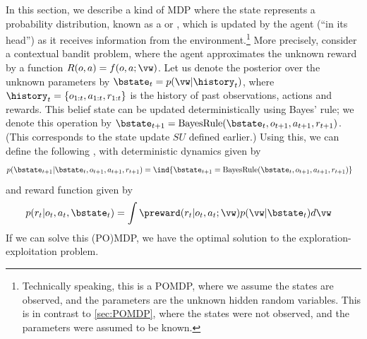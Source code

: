 In this section, we describe a kind of MDP where the state
represents a probability distribution,
known as a  or ,
which is updated by the agent (``in its head'') as it receives
information from the environment.\footnote{
%
Technically speaking,  this is a POMDP, where we assume the states are observed,
and the parameters are the unknown hidden random variables.
This is in contrast to \cref{sec:POMDP},
where the states were not observed, and the parameters were assumed to be known.
} %
More precisely, consider a contextual bandit problem,
where the agent approximates the unknown reward by a function
$R(o,a)=f(o,a;\vw)$.
Let us denote the posterior over the unknown parameters
by $\bstate_t=p(\vw|\history_t)$,
where $\history_t = \{ o_{1:t}, a_{1:t}, r_{1:t} \}$
is the history of past observations, actions and rewards.
This belief state can be updated deterministically using Bayes' rule;
we denote this operation by
$\bstate_{t+1}=\mathrm{BayesRule}(\bstate_{t},o_{t+1},a_{t+1},r_{t+1})$.
(This corresponds to the state update $SU$ defined earlier.)
Using this, we can define the following
,
with deterministic dynamics given by
\begin{align}
  p(\bstate_{t+1}|\bstate_{t},o_{t+1},a_{t+1},r_{t+1})
  &= \ind{\bstate_{t+1}=\mathrm{BayesRule}(\bstate_{t},o_{t+1},a_{t+1},r_{t+1})} 
\end{align}
and reward function given by
\begin{align}
p(r_t|o_t,a_t,\bstate_t) &= \int \preward(r_t|o_t,a_t;\vw) p(\vw|\bstate_t) d\vw
\end{align}
If we can solve this (PO)MDP, we have the optimal solution to the exploration-exploitation
problem. 

